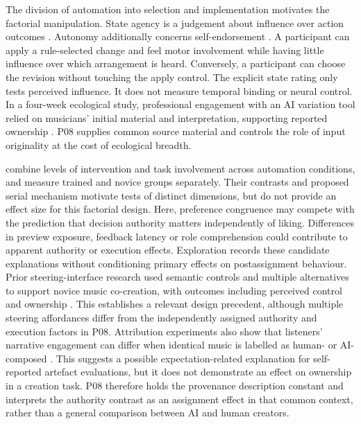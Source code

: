 \documentclass[11pt]{article}
\begin{document}
\par The division of automation into selection and implementation \citep{parasuraman2000} motivates the factorial manipulation. State agency is a judgement about influence over action outcomes \citep{haggard2017}. Autonomy additionally concerns self-endorsement \citep{deci2000}. A participant can apply a rule-selected change and feel motor involvement while having little influence over which arrangement is heard. Conversely, a participant can choose the revision without touching the apply control. The explicit state rating only tests perceived influence. It does not measure temporal binding or neural control. In a four-week ecological study, professional engagement with an AI variation tool relied on musicians' initial material and interpretation, supporting reported ownership \citep{krol2025}. P08 supplies common source material and controls the role of input originality at the cost of ecological breadth.
\par \citet[Sections 3.2--3.5]{he2026} combine levels of intervention and task involvement across automation conditions, and measure trained and novice groups separately. Their contrasts and proposed serial mechanism motivate tests of distinct dimensions, but do not provide an effect size for this factorial design. Here, preference congruence may compete with the prediction that decision authority matters independently of liking. Differences in preview exposure, feedback latency or role comprehension could contribute to apparent authority or execution effects. Exploration records these candidate explanations without conditioning primary effects on postassignment behaviour.
Prior steering-interface research used semantic controls and multiple alternatives to support novice music co-creation, with outcomes including perceived control and ownership \citep{louie2020}. This establishes a relevant design precedent, although multiple steering affordances differ from the independently assigned authority and execution factors in P08. Attribution experiments also show that listeners' narrative engagement can differ when identical music is labelled as human- or AI-composed \citep{wuholmes2026}. This suggests a possible expectation-related explanation for self-reported artefact evaluations, but it does not demonstrate an effect on ownership in a creation task. P08 therefore holds the provenance description constant and interprets the authority contrast as an assignment effect in that common context, rather than a general comparison between AI and human creators.
\end{document}
